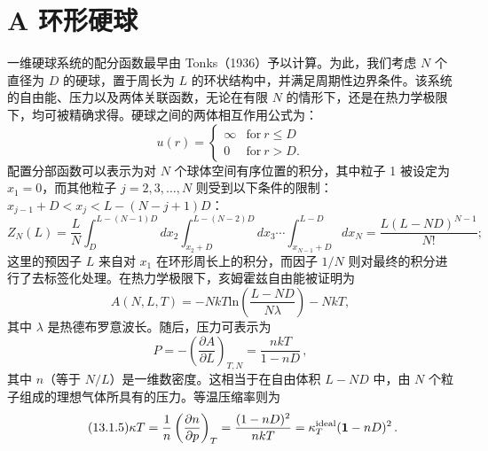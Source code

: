 \section{A 环形硬球}\label{a-ux73afux5f62ux786cux7403}
一维硬球系统的配分函数最早由 Tonks（1936）予以计算。为此，我们考虑 \(N\) 个直径为 \(D\) 的硬球，置于周长为 \(L\) 的环状结构中，并满足周期性边界条件。该系统的自由能、压力以及两体关联函数，无论在有限 \(N\) 的情形下，还是在热力学极限下，均可被精确求得。硬球之间的两体相互作用公式为：
\begin{equation}\tag{13.1.1}\label{eq:13.1.1}
u ( r ) = \left\{ \begin{array}{ll} { \infty } & { \mathrm { f o r } \ r \leq D } \\{ 0 } & { \mathrm { f o r } \ r > D . } \end{array} \right.
\end{equation}
配置分部函数可以表示为对 \(N\) 个球体空间有序位置的积分，其中粒子 1 被设定为 \(x_1=0\)，而其他粒子 \(j=2,3,\ldots,N\) 则受到以下条件的限制：\(x_{j-1}+D<x_j<L-(N-j+1)D\)：
\begin{equation}\tag{13.1.2}\label{eq:13.1.2}
Z _ { N } ( L ) = \frac { L } { N }  \int _ { D } ^{L - ( N - 1 ) D} d x _ { 2 }  \int _ { x _ { 2 } + D } ^{L - ( N - 2 ) D} d x _ { 3 } \cdots \int _ { x _ { N - 1 } + D } ^{L - D} d x _ { N } = \frac { L ( L - N D ) ^{N - 1} } { N ! } ;
\end{equation}
这里的预因子 \(L\) 来自对 \(x_1\) 在环形周长上的积分，而因子 \(1/N\) 则对最终的积分进行了去标签化处理。在热力学极限下，亥姆霍兹自由能被证明为
\begin{equation}\tag{13.1.3}\label{eq:13.1.3}
A ( N , L , T ) = - N k T \mathrm { l n } \left( \frac { L - N D } { N \lambda } \right) - N k T ,
\end{equation}
其中 \(\lambda\) 是热德布罗意波长。随后，压力可表示为
\begin{equation}\tag{13.1.4}\label{eq:13.1.4}
P = - \left( \frac { \partial A } { \partial L } \right) _ { T , N } = \frac { n k T } { 1 - n D } \, ,
\end{equation}
其中 \(n\)（等于 \(N/L\)）是一维数密度。这相当于在自由体积 \(L-ND\) 中，由 \(N\) 个粒子组成的理想气体所具有的压力。等温压缩率则为
\begin{equation}\tag{13.1.5}\label{eq:13.1.5}
\kappa T = \frac { 1 } { n } \left( \frac { \partial n } { \partial p } \right) _ { T } = \frac { ( 1 - n D ) ^{2} } { n k T } = \kappa _ { T } ^{\mathrm { i d e a l} } ( { \bf 1 } - n D ) ^{2} \, .
\end{equation}
